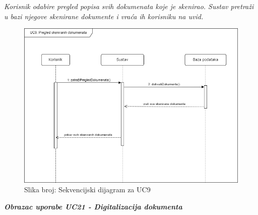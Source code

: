 				\textit{Korisnik odabire pregled popisa svih dokumenata koje je skenirao. Sustav pretraži u bazi njegove skenirane dokumente i vraća ih korisniku na uvid.}
				\begin{figure}[H]
					\includegraphics[width=\textwidth]{slike/sekvencijski_dijagram_UC9.PNG} %
					\caption{Slika broj: Sekvencijski dijagram za UC9}
					\label{fig:UC9} %
				\end{figure}
				\clearpage

				\textbf{\textit{Obrazac uporabe UC21 - Digitalizacija dokumenta}}\\
				
